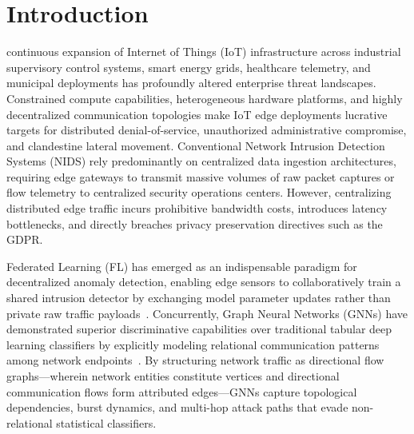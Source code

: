 \documentclass[journal,onecolumn]{IEEEtran}
\begin{document}
\section{Introduction}
\label{sec:introduction}

 continuous expansion of Internet of Things (IoT) infrastructure across industrial supervisory control systems, smart energy grids, healthcare telemetry, and municipal deployments has profoundly altered enterprise threat landscapes. Constrained compute capabilities, heterogeneous hardware platforms, and highly decentralized communication topologies make IoT edge deployments lucrative targets for distributed denial-of-service, unauthorized administrative compromise, and clandestine lateral movement. Conventional Network Intrusion Detection Systems (NIDS) rely predominantly on centralized data ingestion architectures, requiring edge gateways to transmit massive volumes of raw packet captures or flow telemetry to centralized security operations centers. However, centralizing distributed edge traffic incurs prohibitive bandwidth costs, introduces latency bottlenecks, and directly breaches privacy preservation directives such as the GDPR.

Federated Learning (FL) has emerged as an indispensable paradigm for decentralized anomaly detection, enabling edge sensors to collaboratively train a shared intrusion detector by exchanging model parameter updates rather than private raw traffic payloads~\cite{mcmahan2017federated}. Concurrently, Graph Neural Networks (GNNs) have demonstrated superior discriminative capabilities over traditional tabular deep learning classifiers by explicitly modeling relational communication patterns among network endpoints~\cite{velickovic2018gat, hamilton2017graphsage}. By structuring network traffic as directional flow graphs—wherein network entities constitute vertices and directional communication flows form attributed edges—GNNs capture topological dependencies, burst dynamics, and multi-hop attack paths that evade non-relational statistical classifiers.
\end{document}
